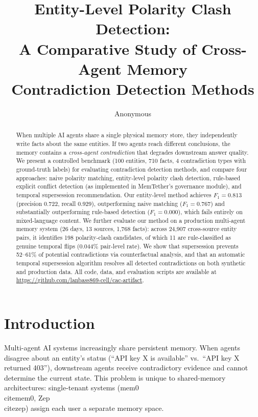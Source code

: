 \documentclass{article}
\title{Entity-Level Polarity Clash Detection:\\A Comparative Study of Cross-Agent Memory\\Contradiction Detection Methods}
\author{Anonymous}
\date{}
\begin{document}
\maketitle

\begin{abstract}
When multiple AI agents share a single physical memory store, they independently write facts about the same entities. If two agents reach different conclusions, the memory contains a \emph{cross-agent contradiction} that degrades downstream answer quality. We present a controlled benchmark (100 entities, 710 facts, 4 contradiction types with ground-truth labels) for evaluating contradiction detection methods, and compare four approaches: naive polarity matching, entity-level polarity clash detection, rule-based explicit conflict detection (as implemented in MemTether's governance module), and temporal supersession recommendation. Our entity-level method achieves $F_1 = 0.813$ (precision 0.722, recall 0.929), outperforming naive matching ($F_1 = 0.767$) and substantially outperforming rule-based detection ($F_1 = 0.000$), which fails entirely on mixed-language content. We further evaluate our method on a production multi-agent memory system (26 days, 13 sources, 1{,}768 facts): across 24{,}907 cross-source entity pairs, it identifies 198 polarity-clash candidates, of which 11 are rule-classified as genuine temporal flips (0.044\% pair-level rate). We show that supersession prevents 52--61\% of potential contradictions via counterfactual analysis, and that an automatic temporal supersession algorithm resolves all detected contradictions on both synthetic and production data. All code, data, and evaluation scripts are available at \url{https://github.com/lanbass869-cell/cac-artifact}.
\end{abstract}

\section{Introduction}
\label{sec:intro}

Multi-agent AI systems increasingly share persistent memory. When agents disagree about an entity's status (``API key X is available'' vs.~``API key X returned 403''), downstream agents receive contradictory evidence and cannot determine the current state. This problem is unique to shared-memory architectures: single-tenant systems (mem0~\\cite{mem0}, Zep~\\cite{zep}) assign each user a separate memory space.
\end{document}
